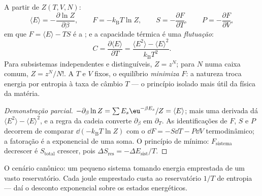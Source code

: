 \begin{proposition}[A máquina]\label{prop:b3:canonical-ensemble:machine}
A partir de $Z(T, V, N)$:
\[
\langle E\rangle = -\frac{\partial\ln Z}{\partial\beta} , \qquad
F = -k_{\text{B}}T\ln Z , \qquad
S = -\frac{\partial F}{\partial T} , \qquad
P = -\frac{\partial F}{\partial V} ,
\]
em que $F = \langle E\rangle - TS$ é a \emph{}; e a
capacidade térmica é uma \emph{flutuação}:
\[
C = \frac{\partial\langle E\rangle}{\partial T}
 = \frac{\langle E^2\rangle - \langle E\rangle^2}
{k_{\text{B}}T^2} .
\]
Para subsistemas independentes e distinguíveis, $Z = z^N$; para $N$
 numa caixa comum, $Z = z^N/N!$. A $T$ e $V$
fixos, o equilíbrio \emph{minimiza} $F$: a natureza troca energia por
entropia à taxa de câmbio $T$ --- o princípio isolado mais útil da
física da matéria.
\end{proposition}

\begin{proof}[Demonstração parcial]
$-\partial_\beta\ln Z = \sum E_s\eu^{-\beta E_s}/Z = \langle
E\rangle$; mais uma derivada dá $\langle E^2\rangle - \langle
E\rangle^2$, e a regra da cadeia converte $\partial_\beta$ em
$\partial_T$. As identificações de $F$, $S$ e $P$ decorrem de comparar
$\dd(-k_{\text{B}}T\ln Z)$ com o $\dd F = -S\dd T - P\dd V$
termodinâmico; a fatoração é a exponencial de uma soma. O princípio de
mínimo: $F_{\text{sistema}}$ decrescer é $S_{\text{total}}$ crescer, pois
$\Delta S_{\text{res}} =
-\Delta E_{\text{sist}}/T$.
\end{proof}

\begin{omfigure}

{\small O cenário canônico: um pequeno sistema tomando energia
emprestada de um vasto reservatório. Cada joule emprestado custa ao
reservatório $1/T$ de entropia --- daí o desconto exponencial sobre os
estados energéticos.}
\end{omfigure}


